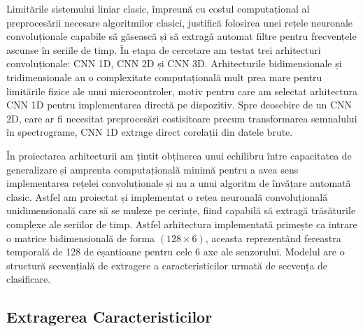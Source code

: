 	Limitările sistemului liniar clasic, împreună cu costul computațional al preprocesării necesare algoritmilor clasici, justifică folosirea unei rețele neuronale convoluționale capabile să găsească și să extragă automat filtre pentru frecvențele ascunse în seriile de timp. În etapa de cercetare am testat trei arhitecturi convoluționale: CNN 1D, CNN 2D și CNN 3D. Arhitecturile bidimensionale și tridimensionale au o complexitate computațională mult prea mare pentru limitările fizice ale unui microcontroler, motiv pentru care am selectat arhitectura CNN 1D pentru implementarea directă pe dispozitiv. Spre deosebire de un CNN 2D, care ar fi necesitat preprocesări costisitoare precum transformarea semnalului în spectrograme, CNN 1D extrage direct corelații din datele brute.
	
	În proiectarea arhitecturii am țintit obținerea unui echilibru între capacitatea de generalizare și amprenta computațională minimă pentru a avea sens implementarea rețelei convoluționale și nu a unui algoritm de învățare automată clasic. Astfel am proiectat și implementat o rețea neuronală convoluțională unidimensională care să se muleze pe cerințe, fiind capabilă să extragă trăsăturile complexe ale seriilor de timp. Astfel arhitectura implementată primește ca intrare o matrice bidimensională de forma $(128 \times 6)$, aceasta reprezentând fereastra temporală de 128 de eșantioane pentru cele 6 axe ale senzorului. Modelul are o structură secvențială de extragere a caracteristicilor urmată de secvența de clasificare. 
	
\subsection{Extragerea Caracteristicilor}	
	
